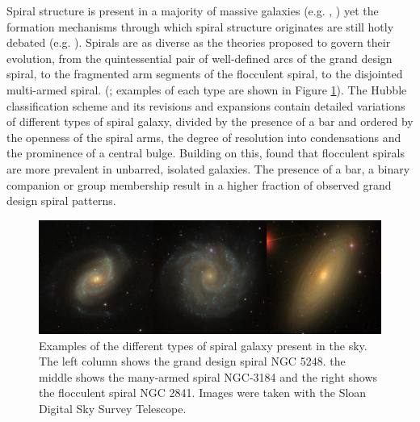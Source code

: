
Spiral structure is present in a majority of massive galaxies (e.g. \citealt{1989gadv.book..151B}, \citealt{2008MNRAS.389.1179L}) yet the formation mechanisms through which spiral structure originates are still hotly debated (e.g. \citealt{2014PASA...31...35D}). Spirals are as diverse as the theories proposed to govern their evolution, from the quintessential pair of well-defined arcs of the grand design spiral, to the fragmented arm segments of the flocculent spiral, to the disjointed multi-armed spiral.
(\citealt{2011ApJ...737...32E}; examples of each type are shown in Figure \ref{fig:spiral-galaxy-types}). The Hubble classification scheme \citep{1926ApJ....64..321H} and its revisions and expansions \citep{1961hag..book.....S,1991rc3..book.....D} contain detailed variations of different types of spiral galaxy, divided by the presence of a bar and ordered by the openness of the spiral arms, the degree of resolution into condensations and the prominence of a central bulge. Building on this, \citet{1982MNRAS.201.1021E} found that flocculent spirals are more prevalent in unbarred, isolated galaxies. The presence of a bar, a binary companion or group membership result in a higher fraction of observed grand design spiral patterns.

\begin{figure}
  \includegraphics[width=15cm]{plots/galaxy_types_remade.jpg}
  \caption{Examples of the different types of spiral galaxy present in the sky. The left column shows the grand design spiral NGC 5248. the middle shows the many-armed spiral NGC-3184 and the right shows the flocculent spiral NGC 2841. Images were taken with the Sloan Digital Sky Survey Telescope.}
  \label{fig:spiral-galaxy-types}
\end{figure}

